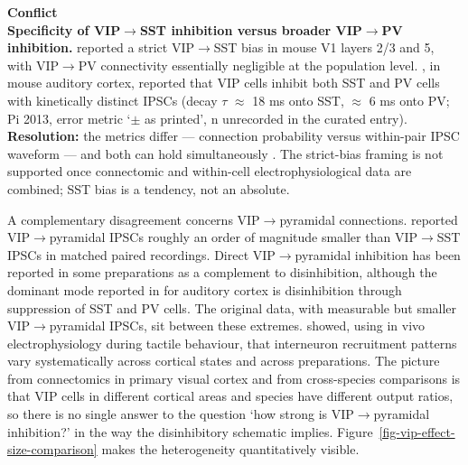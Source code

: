 \documentclass[11pt]{article}
\let\origrightarrow\rightarrow
\def\rightarrow{\ensuremath{\origrightarrow}}
\begin{document}
\begin{framed}
\textbf{Conflict}\\
\textbf{Specificity of VIP\rightarrow SST inhibition versus broader VIP\rightarrow PV inhibition.} \citet{Pfeffer2013} reported a strict VIP\rightarrow SST bias in mouse V1 layers 2/3 and 5, with VIP\rightarrow PV connectivity essentially negligible at the population level. \citet{Pi2013}, in mouse auditory cortex, reported that VIP cells inhibit both SST and PV cells with kinetically distinct IPSCs (decay $\tau$ $\approx$ 18 ms onto SST, $\approx$ 6 ms onto PV; Pi 2013, error metric `$\pm$ as printed', n unrecorded in the curated entry). \textbf{Resolution:} the metrics differ --- connection probability versus within-pair IPSC waveform --- and both can hold simultaneously \citep{Karnani2016a, Karnani2016b, Yu2019, Schneidermizell2025}. The strict-bias framing is not supported once connectomic and within-cell electrophysiological data are combined; SST bias is a tendency, not an absolute.
\end{framed}

A complementary disagreement concerns VIP\rightarrow pyramidal connections. \citet{Pfeffer2013} reported VIP\rightarrow pyramidal IPSCs roughly an order of magnitude smaller than VIP\rightarrow SST IPSCs in matched paired recordings. Direct VIP\rightarrow pyramidal inhibition has been reported in some preparations as a complement to disinhibition, although the dominant mode reported in \citet{Pi2013} for auditory cortex is disinhibition through suppression of SST and PV cells. The original \citet{Lee2013} data, with measurable but smaller VIP\rightarrow pyramidal IPSCs, sit between these extremes. \citet{Yu2019} showed, using in vivo electrophysiology during tactile behaviour, that interneuron recruitment patterns vary systematically across cortical states and across preparations. The picture from connectomics in primary visual cortex \citep{Schneidermizell2025} and from cross-species comparisons \citep{Pronneke2015, Vanderveer2021} is that VIP cells in different cortical areas and species have different output ratios, so there is no single answer to the question `how strong is VIP\rightarrow pyramidal inhibition?' in the way the disinhibitory schematic implies. Figure~\ref{fig-vip-effect-size-comparison} makes the heterogeneity quantitatively visible.
\end{document}
